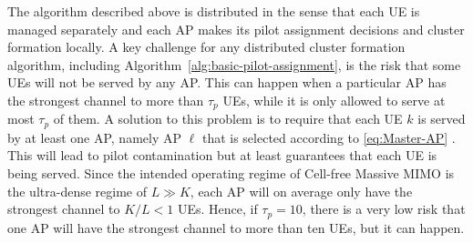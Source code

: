 The algorithm described above is distributed in the sense that each UE is managed separately and each AP makes its pilot assignment decisions and cluster formation locally. A key challenge for any distributed cluster formation algorithm, including Algorithm~\ref{alg:basic-pilot-assignment}, is the risk that some UEs will not be served by any AP. This can happen when a particular AP has the strongest channel to more than $\tau_p$ UEs, while it is only allowed to serve at most $\tau_p$ of them.
A solution to this problem is to require that each UE $k$ is served by at least one AP, namely AP $\ell$ that is selected according to \eqref{eq:Master-AP} \cite{Bjornson2020a}. This will lead to pilot contamination but at least guarantees that each UE is being served.
Since the intended operating regime of Cell-free Massive MIMO is the ultra-dense regime of $L \gg K$, each AP will on average only have the strongest channel to $K/L < 1$ UEs. Hence, if $\tau_p=10$, there is a very low risk that one AP will have the strongest channel to more than ten UEs, but it can happen.


